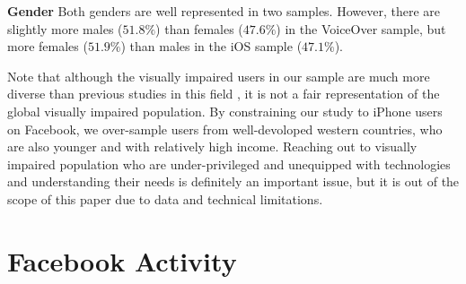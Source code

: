 \documentclass{sigchi}
\begin{document}
\textbf{Gender} Both genders are well represented in two samples. However, there are slightly more males ($51.8\%$) than females ($47.6\%$) in the VoiceOver sample, but more females ($51.9\%$) than males in the iOS sample ($47.1\%$).

Note that although the visually impaired users in our sample are much more diverse than previous studies in this field \cite{wentz2011,brady2013chi,brady2013cscw}, it is not a fair representation of the global visually impaired population. By constraining our study to iPhone users on Facebook,  we over-sample users from well-devoloped western countries, who are also younger and with relatively high income. Reaching out to visually impaired population who are under-privileged and unequipped with technologies and understanding their needs is definitely an important issue, but it is out of the scope of this paper due to data and technical limitations.



\section{Facebook Activity}
\end{document}
